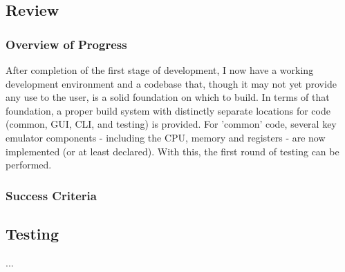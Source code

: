         \inputminted{c++}{code/initial/conversion.cpp}


\subsection{Review}
    \subsubsection{Overview of Progress}
        After completion of the first stage of development, I now have a working development environment and a codebase that, though it may not yet provide any use to the user, is a solid foundation on which to build. In terms of that foundation, a proper build system with distinctly separate locations for code (common, GUI, CLI, and testing) is provided. For 'common' code, several key emulator components - including the CPU, memory and registers - are now implemented (or at least declared). With this, the first round of testing can be performed.

    \subsubsection{Success Criteria}

\subsection{Testing}
    ...
